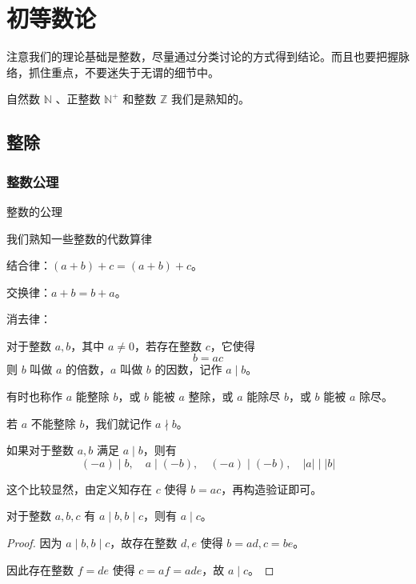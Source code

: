 \chapter{初等数论}

注意我们的理论基础是整数，尽量通过分类讨论的方式得到结论。而且也要把握脉络，抓住重点，不要迷失于无谓的细节中。

自然数 $\mathbb{N}$ 、正整数 $\mathbb{N}^+$ 和整数 $\mathbb{Z}$ 我们是熟知的。

\section{整除}

\subsection{整数公理}

整数的公理

我们熟知一些整数的代数算律

结合律：$(a+b)+c = (a+b)+c$。

交换律：$a+b = b+a$。

消去律：

\begin{definition}
	对于整数 $a,b$，其中 $a\ne 0$，若存在整数 $c$，它使得
	\[ b=ac \]
	则 $b$ 叫做 $a$ 的倍数，$a$ 叫做 $b$ 的因数，记作 $a \mid b$。
\end{definition}

有时也称作 $a$ 能整除 $b$，或 $b$ 能被 $a$ 整除，或 $a$ 能除尽 $b$，或 $b$ 能被 $a$ 除尽。

若 $a$ 不能整除 $b$，我们就记作 $a \nmid b$。

\begin{lemma}
	如果对于整数 $a,b$ 满足 $a \mid b$，则有
	\[ (-a) \mid b,\quad a \mid (-b),\quad (-a) \mid (-b),\quad |a| \mid |b| \]
\end{lemma}

这个比较显然，由定义知存在 $c$ 使得 $b=ac$，再构造验证即可。

\begin{lemma}
	对于整数 $a,b,c$ 有 $a \mid b,b \mid c$，则有 $a \mid c$。
\end{lemma}

\begin{proof}
	因为 $a \mid b,b \mid c$，故存在整数 $d,e$ 使得 $b=ad,c=be$。

	因此存在整数 $f=de$ 使得 $c=af=ade$，故 $a \mid c$。
\end{proof}

